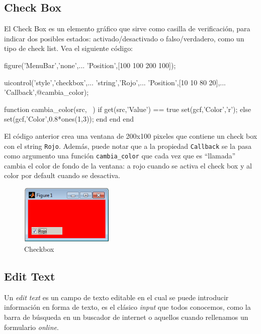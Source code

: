 \subsection{Check Box}\label{check-box}

El Check Box es un elemento gráfico que sirve como casilla de
verificación, para indicar dos posibles estados: activado/desactivado o
falso/verdadero, como un tipo de check list. Vea el siguiente código:


\begin{matlab}
figure('MenuBar','none',...
    'Position',[100 100 200 100]);

uicontrol('style','checkbox',...
    'string','Rojo',...
    'Position',[10 10 80 20],...
    'Callback',@cambia_color);

    function cambia_color(src, ~)
        if get(src,'Value') == true
            set(gcf,'Color','r');
        else
            set(gcf,'Color',0.8*ones(1,3));
        end
    end
end
\end{matlab}

El código anterior crea una ventana de 200x100 pixeles que contiene un
check box con el string \texttt{Rojo}. Además, puede notar que a la
propiedad \texttt{Callback} se la pasa como argumento una función
\verb|cambia_color| que cada vez que es ``llamada'' cambia el color
de fondo de la ventana: a rojo cuando se activa el check box y al color
por default cuando se desactiva.

\begin{figure}[htbp]
\centering
\includegraphics[width=0.4\textwidth]{src/img/ch8/checkbox_example.png}
\caption{Checkbox}
\end{figure}

\subsection{Edit Text}\label{edit-text}

Un \emph{edit text} es un campo de texto editable en el cual se puede
introducir información en forma de texto, es el clásico \emph{input} que
todos conocemos, como la barra de búsqueda en un buscador de internet o
aquellos cuando rellenamos un formulario \emph{online}.

